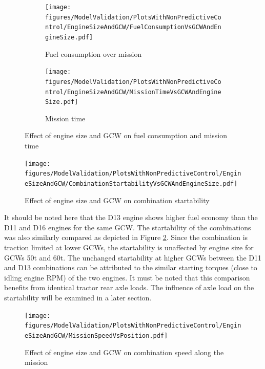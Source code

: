 \documentclass[ExampleMasters.tex]{subfiles}
\begin{document}
\begin{figure}
\begin{subfigure}{.5\textwidth}
\centering
\texttt{[image: figures/ModelValidation/PlotsWithNonPredictiveControl/EngineSizeAndGCW/FuelConsumptionVsGCWAndEngineSize.pdf]}
\caption{Fuel consumption over mission}
\end{subfigure}
\begin{subfigure}{.5\textwidth}
\centering
\texttt{[image: figures/ModelValidation/PlotsWithNonPredictiveControl/EngineSizeAndGCW/MissionTimeVsGCWAndEngineSize.pdf]}
\caption{Mission time}
\end{subfigure}
\caption{Effect of engine size and GCW on fuel consumption and mission time}
\label{timeFuelGCWEngine}
\end{figure}
\begin{figure}
\centering
\texttt{[image: figures/ModelValidation/PlotsWithNonPredictiveControl/EngineSizeAndGCW/CombinationStartabilityVsGCWAndEngineSize.pdf]}
\caption{Effect of engine size and GCW on combination startability}
\label{startabilityEngineGCW}
\end{figure}
It should be noted here that the D13 engine shows higher fuel economy than the D11 and D16 engines for the same GCW. The startability of the combinations was also similarly compared as depicted in Figure \ref{startabilityEngineGCW}. Since the combination is traction limited at lower GCWs, the startability is unaffected by engine size for GCWs 50t and 60t. The unchanged startability at higher GCWs between the D11 and D13 combinations can be attributed to the similar starting torques (close to idling engine RPM) of the two engines. It must be noted that this comparison benefits from identical tractor rear axle loads. The influence of axle load on the startability will be examined in a later section.
\begin{figure}
\centering
\texttt{[image: figures/ModelValidation/PlotsWithNonPredictiveControl/EngineSizeAndGCW/MissionSpeedVsPosition.pdf]}
\caption{Effect of engine size and GCW on combination speed along the mission}
\label{missionSpeedEngineSizeGCW}
\end{figure}
\end{document}
